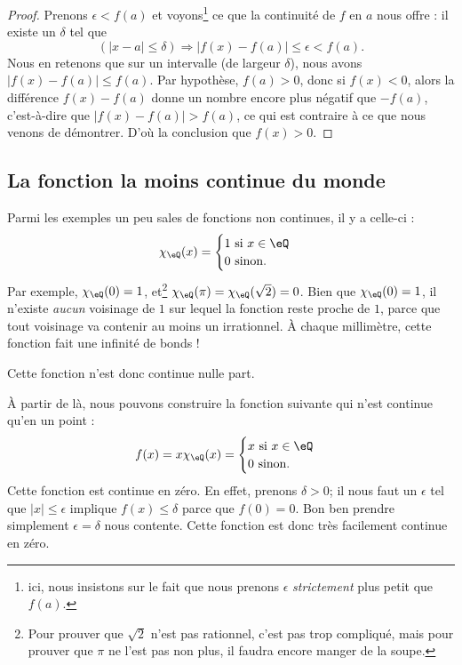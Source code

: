 \begin{proof}
	Prenons \( \epsilon<f(a)\) et voyons\footnote{ici, nous insistons sur le fait que nous prenons \( \epsilon\) \emph{strictement} plus petit que \( f(a)\).} ce que la continuité de \( f\) en \( a\) nous offre : il existe un \( \delta\) tel que
	\[
		(| x-a |\leq \delta)\Rightarrow | f(x)-f(a) |\leq\epsilon < f(a).
	\]
	Nous en retenons que sur un intervalle (de largeur \( \delta\)), nous avons \( | f(x)-f(a) |\leq f(a)\). Par hypothèse, \( f(a)>0\), donc si \( f(x)<0\), alors la différence \( f(x)-f(a)\) donne un nombre encore plus négatif que \( -f(a)\), c'est-à-dire que \( | f(x)-f(a) |>f(a)\), ce qui est contraire à ce que nous venons de démontrer. D'où la conclusion que \( f(x)>0\).
\end{proof}

\subsection{La fonction la moins continue du monde}

Parmi les exemples un peu sales de fonctions non continues, il y a celle-ci :
\[
	\chi_{\eQ}(x)=
	\begin{cases}
		1 \text{ si }x\in\eQ \\
		0 \text{ sinon.}
	\end{cases}
\]
Par exemple, \( \chi_{\eQ}(0)=1\), et\footnote{Pour prouver que \( \sqrt{2}\) n'est pas rationnel, c'est pas trop compliqué, mais pour prouver que \( \pi\) ne l'est pas non plus, il faudra encore manger de la soupe.} \( \chi_{\eQ}(\pi)=\chi_{\eQ}(\sqrt{2})=0\). Bien que \( \chi_{\eQ}(0)=1\), il n'existe \emph{aucun} voisinage de \( 1\) sur lequel la fonction reste proche de \( 1\), parce que tout voisinage va contenir au moins un irrationnel. À chaque millimètre, cette fonction fait une infinité de bonds !

Cette fonction n'est donc continue nulle part.

À partir de là, nous pouvons construire la fonction suivante qui n'est continue qu'en un point :
\[
	f(x)=x\chi_{\eQ}(x)=
	\begin{cases}
		x\text{ si }x\in\eQ \\
		0\text{ sinon.}
	\end{cases}
\]
Cette fonction est continue en zéro. En effet, prenons \( \delta>0\); il nous faut un \( \epsilon\) tel que \( | x |\leq\epsilon\) implique \( f(x)\leq \delta\) parce que \( f(0)=0\). Bon ben prendre simplement \( \epsilon=\delta\) nous contente. Cette fonction est donc très facilement continue en zéro.

